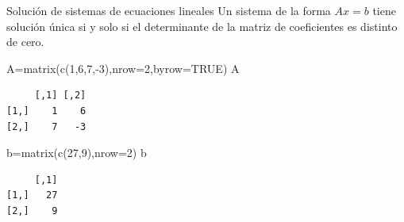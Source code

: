\documentclass[
  ignorenonframetext,
  aspectratio=169,
  spanish,
]{beamer}
\newenvironment{Shaded}{\begin{snugshade}}{\end{snugshade}}
\newcommand{\AttributeTok}[1]{\textcolor[rgb]{0.40,0.45,0.13}{#1}}
\newcommand{\ConstantTok}[1]{\textcolor[rgb]{0.56,0.35,0.01}{#1}}
\newcommand{\DecValTok}[1]{\textcolor[rgb]{0.68,0.00,0.00}{#1}}
\newcommand{\FunctionTok}[1]{\textcolor[rgb]{0.28,0.35,0.67}{#1}}
\newcommand{\NormalTok}[1]{\textcolor[rgb]{0.00,0.23,0.31}{#1}}
\newcommand{\OtherTok}[1]{\textcolor[rgb]{0.00,0.23,0.31}{#1}}
\newcommand{\SpecialCharTok}[1]{\textcolor[rgb]{0.37,0.37,0.37}{#1}}
\begin{document}
\begin{frame}[fragile]{Solución de sistemas de ecuaciones lineales}
\label{soluciuxf3n-de-sistemas-de-ecuaciones-lineales}
Un sistema de la forma \(Ax=b\) tiene solución única si y solo si el
determinante de la matriz de coeficientes es distinto de cero.

\begin{Shaded}
\begin{Highlighting}[]
\NormalTok{A}\OtherTok{=}\FunctionTok{matrix}\NormalTok{(}\FunctionTok{c}\NormalTok{(}\DecValTok{1}\NormalTok{,}\DecValTok{6}\NormalTok{,}\DecValTok{7}\NormalTok{,}\SpecialCharTok{{-}}\DecValTok{3}\NormalTok{),}\AttributeTok{nrow=}\DecValTok{2}\NormalTok{,}\AttributeTok{byrow=}\ConstantTok{TRUE}\NormalTok{) }
\NormalTok{A}
\end{Highlighting}
\end{Shaded}

\begin{verbatim}
     [,1] [,2]
[1,]    1    6
[2,]    7   -3
\end{verbatim}

\begin{Shaded}
\begin{Highlighting}[]
\NormalTok{b}\OtherTok{=}\FunctionTok{matrix}\NormalTok{(}\FunctionTok{c}\NormalTok{(}\DecValTok{27}\NormalTok{,}\DecValTok{9}\NormalTok{),}\AttributeTok{nrow=}\DecValTok{2}\NormalTok{) }
\NormalTok{b}
\end{Highlighting}
\end{Shaded}

\begin{verbatim}
     [,1]
[1,]   27
[2,]    9
\end{verbatim}
\end{frame}
\end{document}
